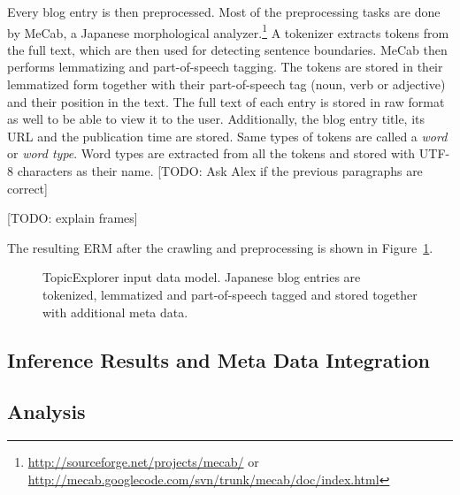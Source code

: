 Every blog entry is then preprocessed. Most of the preprocessing tasks are done by MeCab, a Japanese morphological analyzer.\footnote{\url{http://sourceforge.net/projects/mecab/} or \url{http://mecab.googlecode.com/svn/trunk/mecab/doc/index.html}} A tokenizer extracts tokens from the full text, which are then used for detecting sentence boundaries. MeCab then performs lemmatizing and part-of-speech tagging. The tokens are stored in their lemmatized form together with their part-of-speech tag (noun, verb or adjective) and their position in the text. The full text of each entry is stored in raw format as well to be able to view it to the user. Additionally, the blog entry title, its URL and the publication time are stored. Same types of tokens are called a \emph{word} or \emph{word type}. Word types are extracted from all the tokens and stored with UTF-8 characters as their name. [TODO: Ask Alex if the previous paragraphs are correct]

[TODO: explain frames]

The resulting ERM after the crawling and preprocessing is shown in Figure~\ref{fig:TopicExplorer_data_erm}.

\begin{figure}
\centering
\scalebox{\tikzScale}{\adjustTikzSize }
\caption[TopicExplorer input data model]{TopicExplorer input data model. Japanese blog entries are tokenized, lemmatized and part-of-speech tagged and stored together with additional meta data.}\label{fig:TopicExplorer_data_erm}
\end{figure}

\subsection{Inference Results and Meta Data Integration}

\subsection{Analysis}
